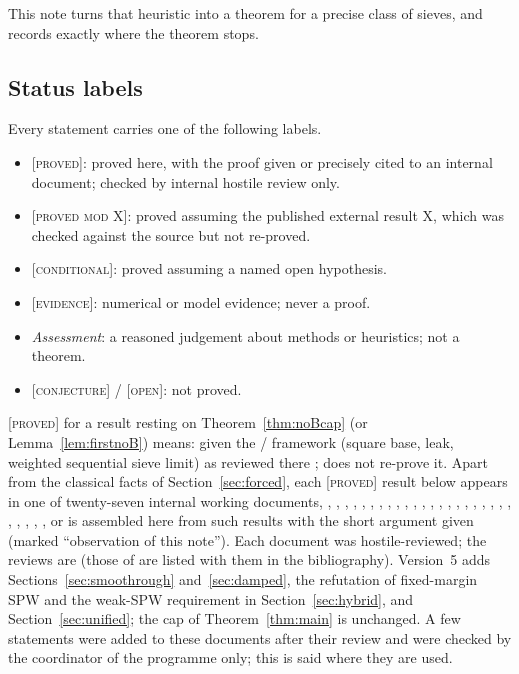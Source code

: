 \documentclass[10pt,reqno]{amsart}
\theoremstyle{definition}
\theoremstyle{remark}
\newcommand{\lab}[1]{\textup{[\textsc{#1}]}}
\begin{document}
This note turns that heuristic into a theorem for a precise class of
sieves, and records exactly where the theorem stops.

\subsection*{Status labels}
Every statement carries one of the following labels.
\begin{itemize}
\item \lab{proved}: proved here, with the proof given or precisely cited
  to an internal document; checked by internal hostile review only.
\item \lab{proved mod X}: proved assuming the published external result X,
  which was checked against the source but not re-proved.
\item \lab{conditional}: proved assuming a named open hypothesis.
\item \lab{evidence}: numerical or model evidence; never a proof.
\item \emph{Assessment}: a reasoned judgement about methods or
  heuristics; not a theorem.
\item \lab{conjecture} / \lab{open}: not proved.
\end{itemize}
\lab{proved} for a result resting on Theorem~\ref{thm:noBcap} (or
Lemma~\ref{lem:firstnoB}) means: given the \cite{KA}/\cite{KA2} framework
(square base, leak, weighted sequential sieve limit) as reviewed there
\cite{KArev,KArev2,KA2rev,KA2rev2}; \cite{KA3} does not re-prove it.
Apart from the classical facts of Section~\ref{sec:forced}, each
\lab{proved} result below appears in one of twenty-seven internal working
documents, \cite{ET}, \cite{EB}, \cite{TW}, \cite{TW2}, \cite{TW3},
\cite{KA}, \cite{TW4}, \cite{NC}, \cite{KA2}, \cite{KA3}, \cite{LS},
\cite{LS2}, \cite{LS3}, \cite{LS4}, \cite{PL}, \cite{IF}, \cite{IF2}, \cite{SPW},
\cite{SPW2}, \cite{TU}, \cite{TU2}, \cite{CU}, \cite{O10}, \cite{O13}, \cite{O14}, \cite{O15}, \cite{O16}, or is
assembled here from such results with the short argument given (marked
``observation of this note'').  Each document was hostile-reviewed; the
reviews are \cite{ETrev,EBrev,TWrev,TW2rev,TW3rev,KArev,KArev2,TW4rev,NCrev,KA2rev,KA2rev2,KA3rev,LSrev,LS2rev,LS2revb,LS3rev,LS4rev,PLrev,IFrev,IF2rev,SPWrev,SPW2rev,TUrev,TU2rev,CUrev}
(those of \cite{O10,O13,O14,O15,O16} are listed with them in the bibliography).
Version~5 adds Sections~\ref{sec:smoothrough} and~\ref{sec:damped}, the refutation of
fixed-margin SPW and the weak-SPW requirement in Section~\ref{sec:hybrid},
and Section~\ref{sec:unified}; the cap of Theorem~\ref{thm:main} is unchanged.
A few statements were added to these documents after their review and
were checked by the coordinator of the programme only; this is said
where they are used.
\end{document}
